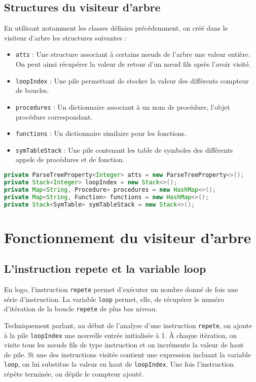 \documentclass[a4paper,11pt]{article}
\begin{document}
\subsection{Structures du visiteur d'arbre}
En utilisant notamment les classes définies précédemment, on créé dans le visiteur d'arbre les structures suivantes :
\begin{itemize}
	\item \lstinline$atts$ : Une structure associant à certains nœuds de l'arbre une valeur entière. On peut ainsi récupérer la valeur de retour d'un nœud fils après l'avoir visité.
	\item \lstinline$loopIndex$ : Une pile permettant de stocker la valeur des différents compteur de boucles.
	\item \lstinline$procedures$ : Un dictionnaire associant à un nom de procédure, l'objet procédure correspondant.
	\item \lstinline$functions$ : Un dictionnaire similaire pour les fonctions.
	\item \lstinline$symTableStack$ : Une pile contenant les table de symboles des différents appels de procédures et de fonction.
\end{itemize}
\begin{lstlisting}[language=Java]
private ParseTreeProperty<Integer> atts = new ParseTreeProperty<>();
private Stack<Integer> loopIndex = new Stack<>();
private Map<String, Procedure> procedures = new HashMap<>();
private Map<String, Function> functions = new HashMap<>();
private Stack<SymTable> symTableStack = new Stack<>();
\end{lstlisting}

\section{Fonctionnement du visiteur d'arbre}
\subsection{L'instruction repete et la variable loop}
En logo, l'instruction \lstinline$repete$ permet d’exécuter un nombre donné de fois une série d'instruction.
La variable \lstinline$loop$ permet, elle, de récupérer le numéro d'itération de la boucle \lstinline$repete$ de plus bas niveau.

Techniquement parlant, au début de l'analyse d'une instruction \lstinline$repete$, on ajoute à la pile \lstinline$loopIndex$ une nouvelle entrée initialisée à 1.
À chaque itération, on visite tous les nœuds fils de type instruction et on incrémente la valeur de haut de pile.
Si une des instructions visitée contient une expression incluant la variable \lstinline$loop$, on lui substitue la valeur en haut de \lstinline$loopIndex$.
Une fois l'instruction répète terminée, on dépile le compteur ajouté.
\end{document}
